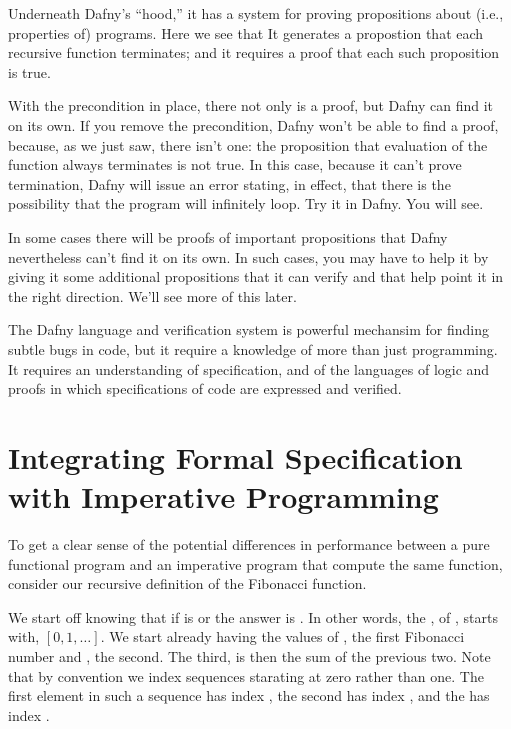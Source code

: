 \documentclass[letterpaper,10pt,english]{sphinxmanual}
\begin{document}
Underneath Dafny’s “hood,” it has a system for proving propositions
about (i.e., properties of) programs. Here we see that It generates a
propostion that each recursive function terminates; and it requires a
proof that each such proposition is true.

With the precondition in place, there not only is a proof, but Dafny
can find it on its own. If you remove the precondition, Dafny won’t be
able to find a proof, because, as we just saw, there isn’t one: the
proposition that evaluation of the function always terminates is not
true. In this case, because it can’t prove termination, Dafny will
issue an error stating, in effect, that there is the possibility that
the program will infinitely loop. Try it in Dafny.  You will see.

In some cases there will be proofs of important propositions that
Dafny nevertheless can’t find it on its own. In such cases, you may
have to help it by giving it some additional propositions that it
can verify and that help point it in the right direction. We’ll see
more of this later.

The Dafny language and verification system is powerful mechansim for
finding subtle bugs in code, but it require a knowledge of more than
just programming. It requires an understanding of specification, and
of the languages of logic and proofs in which specifications of code
are expressed and verified.


\chapter{Integrating Formal Specification with Imperative Programming}
\label{\detokenize{05-putting-it-together:integrating-formal-specification-with-imperative-programming}}\label{\detokenize{05-putting-it-together::doc}}
To get a clear sense of the potential differences in performance
between a pure functional program and an imperative program that
compute the same function, consider our recursive definition of the
Fibonacci function.

We start off knowing that if  is  or  the answer is .  In
other words, the ,  of , starts with, \([0, 1, \ldots ]\). We start already having the
values of , the first Fibonacci number and , the
second. The third,  is then the sum of the previous two.  Note
that by convention we index sequences starating at zero rather than
one. The first element in such a sequence has index , the second
has index , and the  has index .
\end{document}
